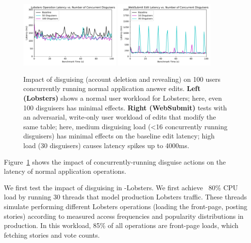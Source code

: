 
\begin{figure}[t!]
    \centering
        \includegraphics[width=0.45\textwidth]{figs/lobsters_concurrent_results}
        \includegraphics[width=0.45\textwidth]{figs/websubmit_concurrent_results_20lec_100users}
    \caption{Impact of disguising (account deletion and revealing) on 100 users concurrently running
    normal application answer edits.
    \textbf{Left (Lobsters)} shows a normal user workload for Lobsters; here, even 100 disguisers
    has minimal effects.
    \textbf{Right (WebSubmit)} tests with an adversarial,
    write-only user workload of edits that modify the same table; here, medium disguising load (<16
    concurrently running disguisers) has minimal effects on the baseline edit latency; high load (30
    disguisers) causes latency spikes up to 4000ms.
    }
    \label{fig:concurrent}
\end{figure}

Figure~\ref{fig:concurrent} shows the impact of concurrently-running disguise actions on the latency
of normal application operations.

We first test the impact of disguising in \sys-Lobsters. We first achieve ~80\% CPU load by running
30 threads that model production Lobsters traffic. These threads simulate performing different
Lobsters operations (\eg loading the front-page, posting stories) according to measured access
frequencies and popularity distributions in production. In this workload, 85\% of all
operations are front-page loads, which fetching stories and vote counts.

